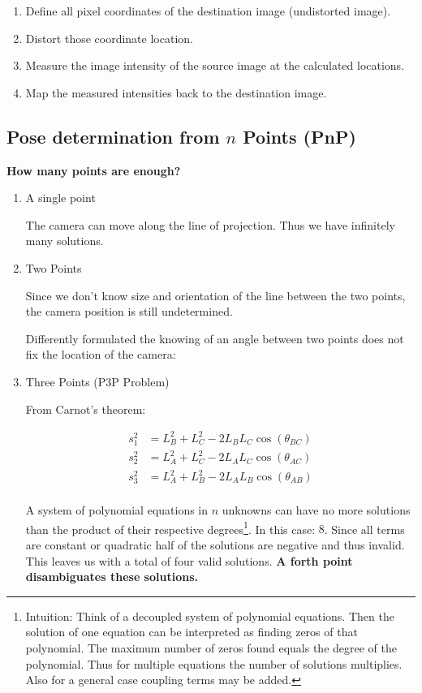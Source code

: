 \documentclass[10pt,a4paper]{scrartcl}
\begin{document}
\begin{multicols*}{2}
\begin{enumerate}
\item Define all pixel coordinates of the destination image (undistorted image).
\item Distort those coordinate location.
\item Measure the image intensity of the source image at the calculated locations.
\item Map the measured intensities back to the destination image.
\end{enumerate}

\subsection{Pose determination from $n$ Points (PnP)}

\textbf{How many points are enough?}

\begin{enumerate}
\item A single point


The camera can move along the line of projection. Thus we have infinitely many solutions.

\item Two Points


Since we don't know size and orientation of the line between the two points, the camera position is still undetermined.

Differently formulated the knowing of an angle between two points does not fix the location of the camera:


\item Three Points (P3P Problem)


From Carnot's theorem:

\begin{align*}
s_1^2&=L_B^2+L_C^2-2L_BL_C\cos(\theta_{BC})\\
s_2^2&=L_A^2+L_C^2-2L_AL_C\cos(\theta_{AC})\\
s_3^2&=L_A^2+L_B^2-2L_AL_B\cos(\theta_{AB})\\
\end{align*}

A system of polynomial equations in $n$ unknowns can have no more solutions than the product of their respective degrees\footnote{Intuition: Think of a decoupled system of polynomial equations. Then the solution of one equation can be interpreted as finding zeros of that polynomial. The maximum number of zeros found equals the degree of the polynomial. Thus for multiple equations the number of solutions multiplies. Also for a general case coupling terms may be added.}. In this case: $8$. Since all terms are constant or quadratic half of the solutions are negative and thus invalid. This leaves us with a total of four valid solutions. \textbf{A forth point disambiguates these solutions.}


\end{enumerate}
\end{multicols*}
\end{document}
